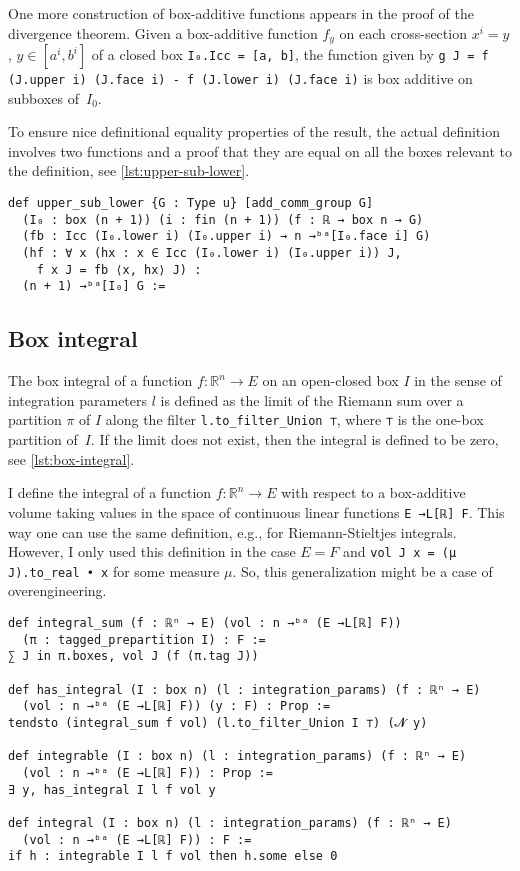 \documentclass[a4paper, UKenglish,cleveref, autoref, thm-restate]{lipics-v2021}
\newcommand{\bbR}{\mathbb{R}}
\begin{document}
One more construction of box-additive functions appears in the proof
of the divergence theorem. Given a box-additive function \(f_{y}\) on
each cross-section \(x^{i}=y\), \(y \in [a^{i}, b^{i}]\) of a closed
box \lstinline~I₀.Icc = [a, b]~, the function given by
\lstinline~g J = f (J.upper i) (J.face i) - f (J.lower i) (J.face i)~
is box additive on subboxes of~\(I_{0}\).

To ensure nice definitional equality properties of the result, the
actual definition involves two functions and a proof that they are
equal on all the boxes relevant to the definition, see
\autoref{lst:upper-sub-lower}.

\begin{lstlisting}[caption={Difference of values of a box-additive map on the front and back faces of a box is a box-additive map},label=lst:upper-sub-lower]
def upper_sub_lower {G : Type u} [add_comm_group G]
  (I₀ : box (n + 1)) (i : fin (n + 1)) (f : ℝ → box n → G)
  (fb : Icc (I₀.lower i) (I₀.upper i) → n →ᵇᵃ[I₀.face i] G)
  (hf : ∀ x (hx : x ∈ Icc (I₀.lower i) (I₀.upper i)) J,
    f x J = fb ⟨x, hx⟩ J) :
  (n + 1) →ᵇᵃ[I₀] G :=
\end{lstlisting}

\subsection{Box integral}%
\label{sec:box-integral}

The box integral of a function \(f\colon\bbR^{n}\to E\) on an
open-closed box \(I\) in the sense of integration parameters \(l\) is
defined as the limit of the Riemann sum over a partition \(\pi\) of
\(I\) along the filter \lstinline=l.to_filter_Union ⊤=, where
\lstinline=⊤= is the one-box partition of~\(I\). If the limit does not
exist, then the integral is defined to be zero, see
\autoref{lst:box-integral}.

I define the integral of a function \(f\colon \bbR^{n}\to E\) with
respect to a box-additive volume taking values in the space of
continuous linear functions \lstinline=E →L[ℝ] F=. This way one can
use the same definition, e.g., for Riemann-Stieltjes integrals.
However, I only used this definition in the case \(E=F\) and
\lstinline+vol J x = (μ J).to_real • x+ for some measure \(\mu\). So,
this generalization might be a case of overengineering.

\begin{lstlisting}[caption={Definition of a box integral},label=lst:box-integral]
def integral_sum (f : ℝⁿ → E) (vol : n →ᵇᵃ (E →L[ℝ] F))
  (π : tagged_prepartition I) : F :=
∑ J in π.boxes, vol J (f (π.tag J))

def has_integral (I : box n) (l : integration_params) (f : ℝⁿ → E)
  (vol : n →ᵇᵃ (E →L[ℝ] F)) (y : F) : Prop :=
tendsto (integral_sum f vol) (l.to_filter_Union I ⊤) (𝓝 y)

def integrable (I : box n) (l : integration_params) (f : ℝⁿ → E)
  (vol : n →ᵇᵃ (E →L[ℝ] F)) : Prop :=
∃ y, has_integral I l f vol y

def integral (I : box n) (l : integration_params) (f : ℝⁿ → E)
  (vol : n →ᵇᵃ (E →L[ℝ] F)) : F :=
if h : integrable I l f vol then h.some else 0
\end{lstlisting}
\end{document}
